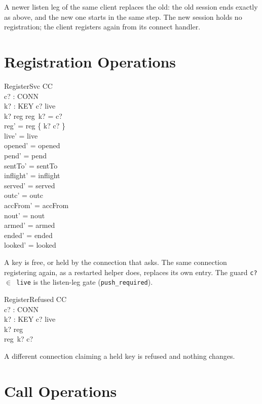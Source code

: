 \documentclass[a4paper,10pt,fleqn]{article}
\begin{document}
A newer listen leg of the same client replaces the old: the old session
ends exactly as above, and the new one starts in the same step.  The new
session holds no registration; the client registers again from its
connect handler.

\section{Registration Operations}

\begin{schema}{RegisterSvc}
  \Delta CC \\
  c? : CONN \\
  k? : KEY
\where
  c? \in live \\
  k? \notin \dom reg \lor reg~k? = c? \\
  reg' = reg \oplus \{ k? \mapsto c? \} \\
  live' = live \\
  opened' = opened \\
  pend' = pend \\
  sentTo' = sentTo \\
  inflight' = inflight \\
  served' = served \\
  outc' = outc \\
  accFrom' = accFrom \\
  nout' = nout \\
  armed' = armed \\
  ended' = ended \\
  looked' = looked
\end{schema}

A key is free, or held by the connection that asks.  The same connection
registering again, as a restarted helper does, replaces its own entry.  The
guard \texttt{c? $\in$ live} is the listen-leg gate (\texttt{push\_required}).

\begin{schema}{RegisterRefused}
  \Xi CC \\
  c? : CONN \\
  k? : KEY
\where
  c? \in live \\
  k? \in \dom reg \\
  reg~k? \neq c?
\end{schema}

A different connection claiming a held key is refused and nothing changes.

\section{Call Operations}
\end{document}
